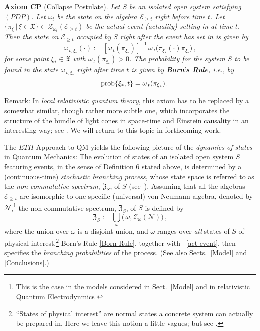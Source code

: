 \documentclass[a4paper,11pt]{article}
\begin{document}
{\bf{Axiom CP}} (Collapse Postulate).\label{collapseaxiom} \textit{Let $S$ be an isolated open system satisfying $(PDP)$. Let
$\omega_t$ be the state on the algebra $\mathcal{E}_{\geq t}$ right \textit{before} time $t$. Let 
$\big\{ \pi_{\xi} \,|\, \xi \in \mathfrak{X} \big\} \subset \mathcal{Z}_{\omega_t}(\mathcal{E}_{\geq t})$ be the actual event (actuality) setting in at time $t$. Then the state on $\mathcal{E}_{\geq t}$ occupied by $S$ right \textit{after} the event has set in is given by 
$$
\omega_{\,t, \xi_{*}}(\cdot):=[\omega_{\,t}(\pi_{\xi_{*}})]^{-1}\,\omega_{\,t}\big(\pi_{\xi_{*}} (\cdot) \pi_{\xi_{*}}\big) \,,
$$
for some point $\xi_{*} \in \mathfrak{X}$ with $\omega_{\,t}(\pi_{\xi_{*}})>0$. The probability for the system $S$ to be found in the state $\omega_{\,t,\xi_{*}}$ right \textit{after} time $t$ is given by {\bf{Born's Rule}}, i.e., by}
\begin{equation}\label{Born Rule}
\hspace{4.9cm}\text{\rm{prob}}\{\xi_{*}, t\} = \omega_{\,t}(\pi_{\xi_{*}}). \hspace{4.5cm} \square
\vspace{0.2cm}
\end{equation}

\underline{Remark}: In \textit{local relativistic quantum theory}, this axiom has to be replaced by a somewhat similar, though
rather more subtle one, which incorporates the structure of the bundle of light cones in space-time and Einstein causality in an 
interesting way; see \cite{Fr2}. We will return to this topic in forthcoming work. 

The $ETH$-Approach to QM yields the following picture of the \textit{dynamics of states} in Quantum Mechanics: 
The evolution of states of an isolated open system $S$ featuring events, in the sense of Definition 6 stated above, 
is determined by a (continuous-time) \textit{stochastic branching process}, whose state space is referred to 
as the {\em{non-commutative spectrum}}, $\mathfrak{Z}_{S}$, of $S$ (see~\cite{Fr1}). Assuming that all the algebras 
$\mathcal{E}_{\geq t}$ are isomorphic to one specific (universal) von Neumann algebra, denoted by $\mathcal{N}$,\footnote{This is the case in the models considered in Sect.~\ref{Model} and in relativistic Quantum Electrodynmics  \cite{Buchholz}} the non-commutative spectrum, $\mathfrak{Z}_{S}$, of $S$ is defined by
\begin{equation}\label{NCspect}
\mathfrak{Z}_{S}:= \bigcup_{\omega} \Big(\,\omega, \mathcal{Z}_{\omega}(\mathcal{N})\Big)\,, 
\end{equation}
where the union over $\omega$ is a disjoint union, and $\omega$ ranges over \textit{all} states of $S$ of physical interest.\footnote{``States of physical interest'' are normal states a concrete system can actually be prepared in. Here we leave this notion a little vagues; but see \cite{Haag, Fr-Schub}.}
Born's Rule \eqref{Born Rule}, together with ~\eqref{act-event}, then specifies the \textit{branching probabilities} 
of the process. (See also Sects.~\ref{Model} and \ref{Conclusions}.)\\
\end{document}
